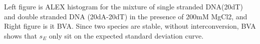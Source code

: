 Left figure is ALEX histogram for the mixture of single stranded DNA(20dT) and double stranded DNA (20dA-20dT) in the presence of 200mM MgCl2, and Right figure is it BVA. Since two species are stable, without interconversion, BVA shows that $s_E$ only sit on the expected standard deviation curve.   